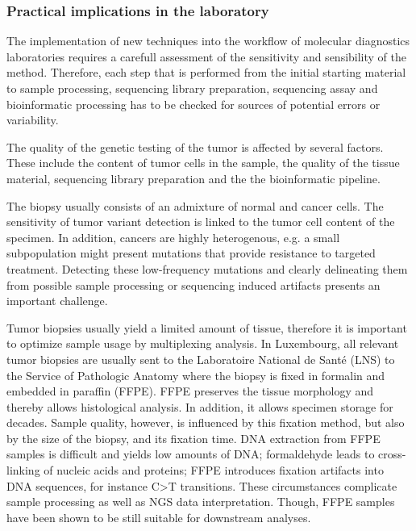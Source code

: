 {{    \subsubsection{Practical implications in the laboratory}

      The implementation of new techniques into the workflow of molecular
      diagnostics laboratories requires a carefull assessment of the sensitivity
      and sensibility of the method. Therefore, each step that is performed from
      the initial starting material to sample processing, sequencing library
      preparation, sequencing assay and bioinformatic processing has to be
      checked for sources of potential errors or variability.

      The quality of the genetic testing of the tumor is affected by several
      factors. These include the content of tumor cells in the sample, the
      quality of the tissue material, sequencing library preparation and the the
      bioinformatic pipeline.

      The biopsy usually consists of an admixture of normal and cancer cells.
      The sensitivity of tumor variant detection is linked to the tumor cell
      content of the specimen. In addition, cancers are highly heterogenous,
      e.g. a small subpopulation might present mutations that provide resistance
      to targeted treatment. Detecting these low-frequency mutations and clearly
      delineating them from possible sample processing or sequencing induced
      artifacts presents an important challenge.

      Tumor biopsies usually yield a limited amount of tissue, therefore it is
      important to optimize sample usage by multiplexing analysis. In
      Luxembourg, all relevant tumor biopsies are usually sent to the
      Laboratoire National de Santé (LNS) to the Service of Pathologic Anatomy
      where the biopsy is fixed in formalin and embedded in paraffin (FFPE).
      FFPE preserves the tissue morphology and thereby allows histological
      analysis. In addition, it allows specimen storage for decades. Sample
      quality, however, is influenced by this fixation method, but also by the
      size of the biopsy, and its fixation time. DNA extraction from FFPE
      samples is difficult and yields low amounts of DNA; formaldehyde
      leads to cross-linking of nucleic acids and proteins; FFPE introduces
      fixation artifacts into DNA sequences, for instance C>T transitions.
      These circumstances complicate sample processing as well as NGS data
      interpretation. Though, FFPE samples have been shown to be still suitable
      for downstream analyses.

}}
